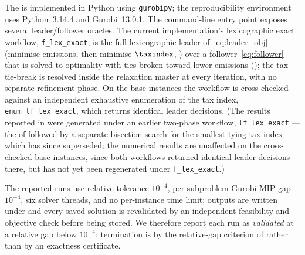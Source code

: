 The \DBP is implemented in Python using \texttt{gurobipy}; the
reproducibility environment uses Python~3.14.4 and Gurobi~13.0.1. The
command-line entry point  exposes several
leader/follower oracles. The current implementation's lexicographic exact
workflow, \texttt{f\_lex\_exact}, is the full lexicographic leader
of~\eqref{eq:leader_obj} (minimise emissions, then minimise $\taxindex$,
) over a follower~\eqref{eq:follower} that is solved
to optimality with ties broken toward lower emissions (); the
tax tie-break is resolved inside the relaxation master at every \DBP
iteration, with no separate refinement phase. On the base instances the
workflow is cross-checked against an independent exhaustive enumeration of
the tax index, \texttt{enum\_lf\_lex\_exact}, which returns identical leader
decisions. (The results reported in  were generated
under an earlier two-phase workflow, \texttt{lf\_lex\_exact} --- the \DBP of
 followed by a separate bisection search for the
smallest tying tax index --- which  has since
superseded; the numerical results are unaffected on the cross-checked base
instances, since both workflows returned identical leader decisions there,
but  has not yet been regenerated under
\texttt{f\_lex\_exact}.)

The reported runs use relative \DBP tolerance $10^{-4}$, per-subproblem Gurobi
MIP gap $10^{-4}$, six solver threads, and no per-instance time limit; outputs
are written under  and every saved solution is revalidated
by an independent feasibility-and-objective check before being stored. We
therefore report each run as \emph{validated} at a relative gap below
$10^{-4}$: termination is by the relative-gap criterion of 
rather than by an exactness certificate.
